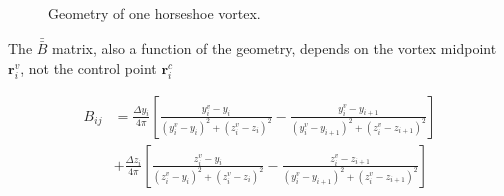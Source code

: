 \documentclass[10pt, a4paper]{article}
\begin{document}
\begin{figure}[h!]
\begin{subfigmatrix}{2}
 \end{subfigmatrix}
 \caption{Geometry of one horseshoe vortex.}
 \label{f:singlevortex}
\end{figure}

The $\bar{\bar{B}}$ matrix, also a function of the geometry, depends on the vortex midpoint $\mathbf{r}_i^v$, not the control point $\mathbf{r}_i^c$

\begin{align}
    B_{ij} &= \frac{\Delta y_i}{4\pi} \left[ \frac{y_i^v - y_i}{(y_i^v - y_i)^2 + (z_i^v - z_i)^2} - \frac{y_i^v - y_{i+1}}{(y_i^v - y_{i+1})^2 + (z_i^v - z_{i+1})^2} \right] \\
    &+ \frac{\Delta z_i}{4\pi} \left[ \frac{z_i^v - y_i}{(z_i^v - y_i)^2 + (z_i^v - z_i)^2} - \frac{z_i^v - z_{i+1}}{(y_i^v - y_{i+1})^2 + (z_i^v - z_{i+1})^2} \right] \nonumber
\end{align}
\end{document}
